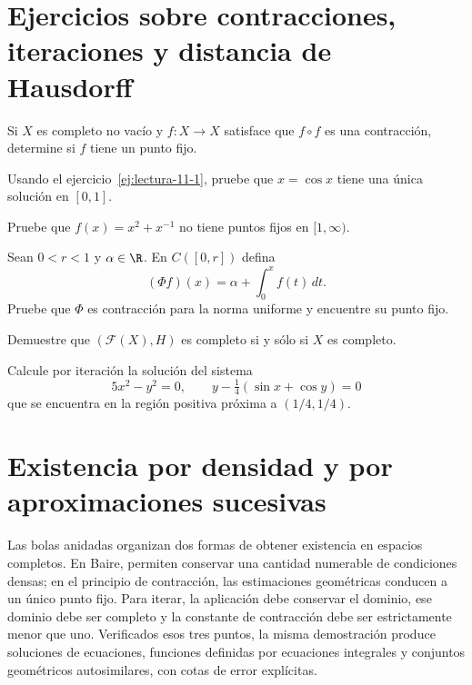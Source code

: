 \section{Ejercicios sobre contracciones, iteraciones y distancia de Hausdorff}
\begin{ejercicio}\label{ej:lectura-11-1}
Si $X$ es completo no vacío y $f:X\to X$ satisface que $f\circ f$ es una contracción, determine si $f$ tiene un punto fijo.
\end{ejercicio}


\begin{ejercicio}\label{ej:lectura-11-2}
Usando el ejercicio~\ref{ej:lectura-11-1}, pruebe que $x=\cos x$ tiene una única solución en $[0,1]$.
\end{ejercicio}


\begin{ejercicio}\label{ej:lectura-11-3}
Pruebe que $f(x)=x^2+x^{-1}$ no tiene puntos fijos en $[1,\infty)$.
\end{ejercicio}


\begin{ejercicio}\label{ej:lectura-11-4}
Sean $0<r<1$ y $\alpha\in\R$. En $C([0,r])$ defina
\[
 (\Phi f)(x)=\alpha+\int_0^x f(t)\,dt.
\]
Pruebe que $\Phi$ es contracción para la norma uniforme y encuentre su punto fijo.
\end{ejercicio}


\begin{ejercicio}\label{ej:lectura-11-5}\label{ch11:hiper-completo}
Demuestre que $(\mathcal F(X),H)$ es completo si y sólo si $X$ es completo.
\end{ejercicio}


\begin{ejercicio}\label{ej:lectura-11-6}
Calcule por iteración la solución del sistema
\[
 5x^2-y^2=0,\qquad y-\tfrac14(\sin x+\cos y)=0
\]
que se encuentra en la región positiva próxima a $(1/4,1/4)$.
\end{ejercicio}


\section{Existencia por densidad y por aproximaciones sucesivas}
Las bolas anidadas organizan dos formas de obtener existencia en espacios completos. En Baire, permiten conservar una cantidad numerable de condiciones densas; en el principio de contracción, las estimaciones geométricas conducen a un único punto fijo. Para iterar, la aplicación debe conservar el dominio, ese dominio debe ser completo y la constante de contracción debe ser estrictamente menor que uno. Verificados esos tres puntos, la misma demostración produce soluciones de ecuaciones, funciones definidas por ecuaciones integrales y conjuntos geométricos autosimilares, con cotas de error explícitas.

